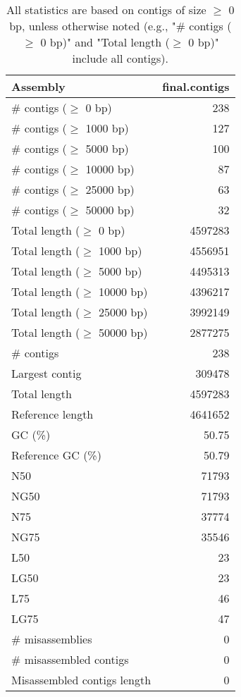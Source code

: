 \documentclass[12pt,a4paper]{article}
\begin{document}
\begin{table}[ht]
\begin{center}
\caption{All statistics are based on contigs of size $\geq$ 0 bp, unless otherwise noted (e.g., "\# contigs ($\geq$ 0 bp)" and "Total length ($\geq$ 0 bp)" include all contigs).}
\begin{tabular}{|l*{1}{|r}|}
\hline
Assembly & final.contigs \\ \hline
\# contigs ($\geq$ 0 bp) & 238 \\ \hline
\# contigs ($\geq$ 1000 bp) & 127 \\ \hline
\# contigs ($\geq$ 5000 bp) & 100 \\ \hline
\# contigs ($\geq$ 10000 bp) & 87 \\ \hline
\# contigs ($\geq$ 25000 bp) & 63 \\ \hline
\# contigs ($\geq$ 50000 bp) & 32 \\ \hline
Total length ($\geq$ 0 bp) & 4597283 \\ \hline
Total length ($\geq$ 1000 bp) & 4556951 \\ \hline
Total length ($\geq$ 5000 bp) & 4495313 \\ \hline
Total length ($\geq$ 10000 bp) & 4396217 \\ \hline
Total length ($\geq$ 25000 bp) & 3992149 \\ \hline
Total length ($\geq$ 50000 bp) & 2877275 \\ \hline
\# contigs & 238 \\ \hline
Largest contig & 309478 \\ \hline
Total length & 4597283 \\ \hline
Reference length & 4641652 \\ \hline
GC (\%) & 50.75 \\ \hline
Reference GC (\%) & 50.79 \\ \hline
N50 & 71793 \\ \hline
NG50 & 71793 \\ \hline
N75 & 37774 \\ \hline
NG75 & 35546 \\ \hline
L50 & 23 \\ \hline
LG50 & 23 \\ \hline
L75 & 46 \\ \hline
LG75 & 47 \\ \hline
\# misassemblies & 0 \\ \hline
\# misassembled contigs & 0 \\ \hline
Misassembled contigs length & 0 \\ \hline

\end{tabular}
\end{center}
\end{table}
\end{document}
